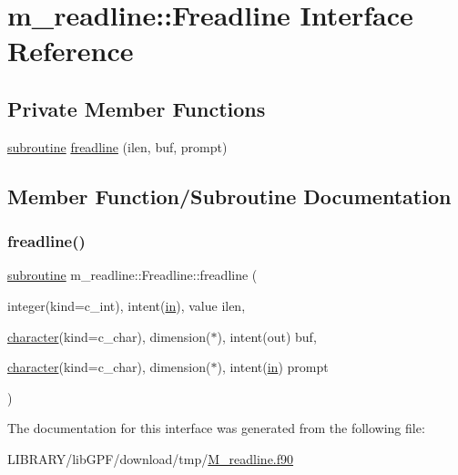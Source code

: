 \hypertarget{interfacem__readline_1_1Freadline}{}\section{m\+\_\+readline\+:\+:Freadline Interface Reference}
\label{interfacem__readline_1_1Freadline}
\subsection*{Private Member Functions}
\begin{DoxyCompactItemize}
\item 
\hyperlink{M__stopwatch_83_8txt_acfbcff50169d691ff02d4a123ed70482}{subroutine} \hyperlink{interfacem__readline_1_1Freadline_ae441234495ff8c5daae930cd6ea51115}{freadline} (ilen, buf, prompt)
\end{DoxyCompactItemize}


\subsection{Member Function/\+Subroutine Documentation}
\mbox{\label{interfacem__readline_1_1Freadline_ae441234495ff8c5daae930cd6ea51115}} 
\subsubsection{\texorpdfstring{freadline()}{freadline()}}
{\footnotesize\ttfamily \hyperlink{M__stopwatch_83_8txt_acfbcff50169d691ff02d4a123ed70482}{subroutine} m\+\_\+readline\+::\+Freadline\+::freadline (\begin{DoxyParamCaption}\item[{integer(kind=c\+\_\+int), intent(\hyperlink{M__journal_83_8txt_afce72651d1eed785a2132bee863b2f38}{in}), value}]{ilen,  }\item[{\hyperlink{option__stopwatch_83_8txt_abd4b21fbbd175834027b5224bfe97e66}{character}(kind=c\+\_\+char), dimension($\ast$), intent(out)}]{buf,  }\item[{\hyperlink{option__stopwatch_83_8txt_abd4b21fbbd175834027b5224bfe97e66}{character}(kind=c\+\_\+char), dimension($\ast$), intent(\hyperlink{M__journal_83_8txt_afce72651d1eed785a2132bee863b2f38}{in})}]{prompt }\end{DoxyParamCaption})\hspace{0.3cm}{\ttfamily [private]}}



The documentation for this interface was generated from the following file\+:\begin{DoxyCompactItemize}
\item 
L\+I\+B\+R\+A\+R\+Y/lib\+G\+P\+F/download/tmp/\hyperlink{M__readline_8f90}{M\+\_\+readline.\+f90}\end{DoxyCompactItemize}
